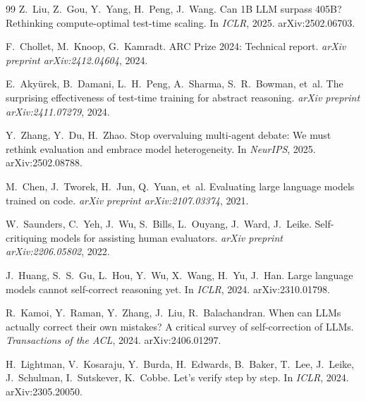 \documentclass[11pt]{amsart}
\newcommand\1{{\mathds{1}}}
\theoremstyle{definition}
\theoremstyle{remark}
\numberwithin{equation}{section}
\begin{document}
\begin{thebibliography}{99}
Z.~Liu, Z.~Gou, Y.~Yang, H.~Peng, J.~Wang.
\newblock Can 1B LLM surpass 405B? Rethinking compute-optimal test-time scaling.
\newblock In \emph{ICLR}, 2025. arXiv:2502.06703.

F.~Chollet, M.~Knoop, G.~Kamradt.
\newblock ARC Prize 2024: Technical report.
\newblock \emph{arXiv preprint arXiv:2412.04604}, 2024.

E.~Aky\"urek, B.~Damani, L.~H.~Peng, A.~Sharma, S.~R.~Bowman, et~al.
\newblock The surprising effectiveness of test-time training for abstract reasoning.
\newblock \emph{arXiv preprint arXiv:2411.07279}, 2024.

Y.~Zhang, Y.~Du, H.~Zhao.
\newblock Stop overvaluing multi-agent debate: We must rethink evaluation and embrace model heterogeneity.
\newblock In \emph{NeurIPS}, 2025. arXiv:2502.08788.

M.~Chen, J.~Tworek, H.~Jun, Q.~Yuan, et~al.
\newblock Evaluating large language models trained on code.
\newblock \emph{arXiv preprint arXiv:2107.03374}, 2021.

W.~Saunders, C.~Yeh, J.~Wu, S.~Bills, L.~Ouyang, J.~Ward, J.~Leike.
\newblock Self-critiquing models for assisting human evaluators.
\newblock \emph{arXiv preprint arXiv:2206.05802}, 2022.

J.~Huang, S.~S.~Gu, L.~Hou, Y.~Wu, X.~Wang, H.~Yu, J.~Han.
\newblock Large language models cannot self-correct reasoning yet.
\newblock In \emph{ICLR}, 2024. arXiv:2310.01798.

R.~Kamoi, Y.~Raman, Y.~Zhang, J.~Liu, R.~Balachandran.
\newblock When can LLMs actually correct their own mistakes? A critical survey of self-correction of LLMs.
\newblock \emph{Transactions of the ACL}, 2024. arXiv:2406.01297.

H.~Lightman, V.~Kosaraju, Y.~Burda, H.~Edwards, B.~Baker, T.~Lee, J.~Leike, J.~Schulman, I.~Sutskever, K.~Cobbe.
\newblock Let's verify step by step.
\newblock In \emph{ICLR}, 2024. arXiv:2305.20050.

\end{thebibliography}
\end{document}
